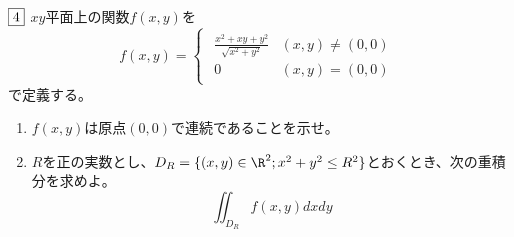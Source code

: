 \begin{tcolorbox} %
	$\fbox{4}$ $xy$平面上の関数$f(x, y)$を
\begin{equation*}
	f(x, y)= 
\begin{cases}
\begin{matrix}
	\frac{x^2+ xy+ y^2}{\sqrt{x^2+ y^2}}& (x, y)\ne (0 ,0)\\
	0& (x, y)= (0, 0)
\end{matrix}
\end{cases}
\end{equation*}
	で定義する。
\begin{enumerate}
	\item $f(x, y)$は原点$(0, 0)$で連続であることを示せ。
	\item $R$を正の実数とし、$D_R= \{(x, y)\in \R^2; x^2+ y^2\le R^2\}$とおくとき、次の重積分を求めよ。
\begin{equation*}
	\iint_{D_R} f(x, y) dxdy
\end{equation*}
\end{enumerate}
\end{tcolorbox}

